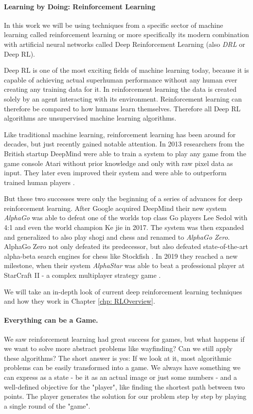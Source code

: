  \paragraph{Learning by Doing: Reinforcement Learning} In this work we will be using techniques from a specific sector of machine learning called reinforcement learning or more specifically its modern combination with artificial neural networks called Deep Reinforcement Learning (also \textit{DRL} or Deep RL).

 Deep RL is one of the most exciting fields of machine learning today, because it is capable of achieving actual superhuman performance without any human ever creating any training data for it. In reinforcement learning the data is created solely by an agent interacting with its environment. Reinforcement learning can therefore be compared to how humans learn themselves. Therefore all Deep RL algorithms are unsupervised machine learning algorithms.

 Like traditional machine learning, reinforcement learning has been around for decades, but just recently gained notable attention. In 2013 researchers from the British startup DeepMind were able to train a system to play any game from the game console Atari without prior knowledge and only with raw pixel data as input. \cite{mnih2013playing} They later even improved their system and were able to outperform trained human players \cite{mnih2015human}.

 But these two successes were only the beginning of a series of advances for deep reinforcement learning. After Google acquired DeepMind their new system \textit{AlphaGo} was able to defeat one of the worlds top class Go players Lee Sedol with 4:1 \cite{borowiec2016alphago} and even the world champion Ke jie in 2017. The system was then expanded and generalized to also play shogi and chess and renamed to \textit{AlphaGo Zero}. AlphaGo Zero not only defeated its predecessor, but also defeated state-of-the-art alpha-beta search engines for chess like Stockfish \cite{silver2017mastering}. In 2019 they reached a new milestone, when their system \textit{AlphaStar} was able to beat a professional player at StarCraft II - a complex multiplayer strategy game \cite{arulkumaran2019alphastar}.

We will take an in-depth look of current deep reinforcement learning techniques and how they work in Chapter \ref{chp: RLOverview}.

 \paragraph{Everything can be a Game.}
 We saw reinforcement learning had great success for games, but what happens if we want to solve more abstract problems like wayfinding? Can we still apply these algorithms? The short answer is yes: If we look at it, most algorithmic problems can be easily transformed into a game. We always have something we can express as a state - be it as an actual image or just some numbers - and a well-defined objective for the "player", like finding the shortest path between two points. The player generates the solution for our problem step by step by playing a single round of the "game".

